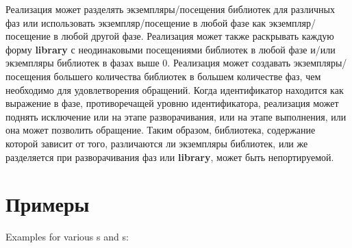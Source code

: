 Реализация может разделять экземпляры/посещения библиотек для различных фаз или
использовать экземпляр/посещение в любой фазе как экземпляр/посещение в любой другой
фазе. Реализация может также раскрывать каждую форму {\cf\bfseries library} с неодинаковыми
посещениями библиотек в любой фазе и/или экземпляры библиотек в фазах выше $0$. Реализация
может создавать экземпляры/посещения большего количества библиотек в большем количестве фаз, чем
необходимо для удовлетворения обращений. Когда идентификатор находится как выражение в фазе,
противоречащей уровню идентификатора, реализация может поднять исключение или на этапе разворачивания,
или на этапе выполнения, или она может позволить обращение. Таким образом, библиотека,
содержание которой зависит от того, различаются ли экземпляры библиотек, или же разделяется при
разворачивания фаз или {\cf\bfseries library}, может быть непортируемой.\vspace{-4mm}

\section{Примеры}\vspace{-1mm}

Examples for various s and s:

